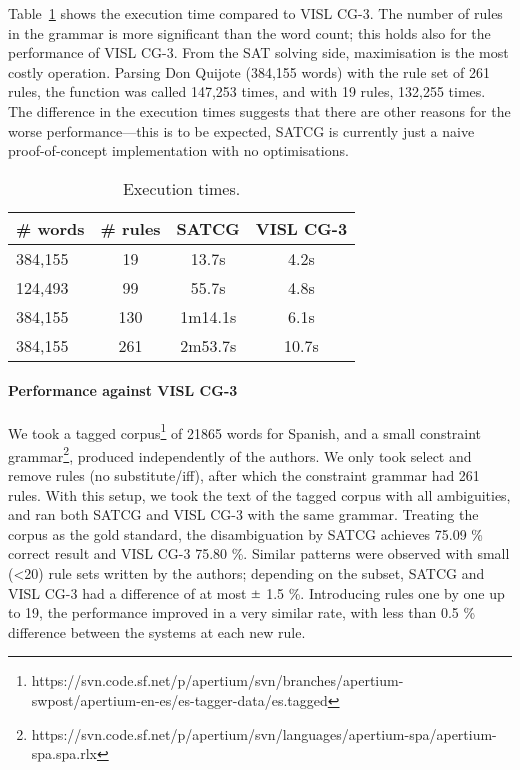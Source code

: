 \documentclass[11pt]{article}
\newcommand{\Mypm}{\mathbin{\tikz [x=1.4ex,y=1.4ex,line width=.1ex] \draw (0.0,0) -- (1.0,0) (0.5,0.08) -- (0.5,0.92) (0.0,0.5) -- (1.0,0.5);}}%
\begin{document}
Table~\ref{table:time} shows the execution time compared to VISL CG-3. 
The number of rules in the grammar is more significant than the word
count; this holds also for the performance of VISL CG-3.
From the SAT solving side, maximisation is the most costly operation.
Parsing Don Quijote (384,155 words) with the rule set of 261 rules,
the function was called 147,253 times, and with 19 rules, 132,255 times.
The difference in the execution times suggests that there are other
reasons for the worse performance---this is to be expected,
SATCG is currently just a naive proof-of-concept implementation with no optimisations.

\begin{table}
  \centering
  \begin{tabular}{|l|c|c|c|}
     \hline
   \textbf{\# words} & \textbf{\# rules} &  \textbf{SATCG} & \textbf{VISL CG-3} \\ \hline
                384,155  & 19   &  13.7s   & 4.2s\\ %
                124,493  & 99   &  55.7s   & 4.8s \\ %
	        384,155  & 130  &  1m14.1s & 6.1s \\ %
                384,155  & 261  &  2m53.7s & 10.7s \\ \hline
  \end{tabular}
  \caption{Execution times.}
  \label{table:time}
\end{table}

\paragraph{Performance against VISL CG-3}


We took a tagged corpus\footnote{https://svn.code.sf.net/p/apertium/svn/branches/apertium-swpost/apertium-en-es/es-tagger-data/es.tagged} of 21865 words for Spanish, 
and a small constraint grammar\footnote{https://svn.code.sf.net/p/apertium/svn/languages/apertium-spa/apertium-spa.spa.rlx}, produced independently of the authors.
We only took select and remove rules (no substitute/iff), after which the constraint grammar had 261 rules.
With this setup, we took the text of the tagged corpus with all
ambiguities, and ran both SATCG and VISL CG-3 with the same grammar. 
Treating the corpus as the gold standard, the disambiguation by
SATCG achieves 75.09 \% correct result and VISL CG-3 75.80 \%.
Similar patterns were observed with small (\textless{}20) rule sets
written by the authors; depending on the subset, SATCG and VISL CG-3 had
a difference of at most $\Mypm$ 1.5 \%. 
Introducing rules one by one up to 19, the
performance improved in a very similar rate, with less than 0.5 \%
difference between the systems at each new rule.
\end{document}
